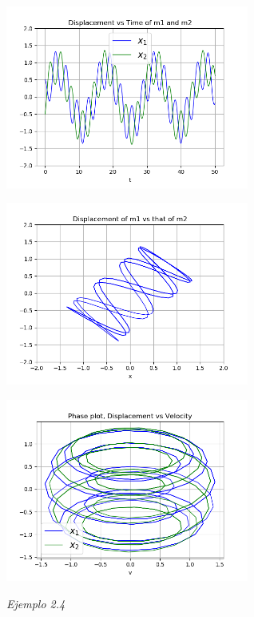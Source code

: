 \documentclass[a4paper]{article}
\begin{document}
\begin{center}
\includegraphics[height=6cm]{ejemplo2-3.png}

\includegraphics[height=6cm]{recta2-3.png}

\includegraphics[height=6cm]{circulo2-3.png}
\end{center}

\textit{Ejemplo 2.4}
\end{document}
